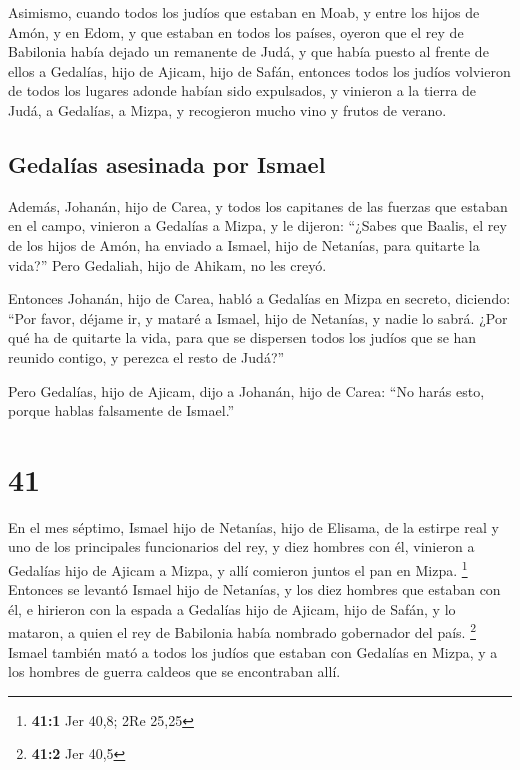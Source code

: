  Asimismo, cuando todos los judíos que estaban en Moab, y
entre los hijos de Amón, y en Edom, y que estaban en todos los países,
oyeron que el rey de Babilonia había dejado un remanente de Judá, y que
había puesto al frente de ellos a Gedalías, hijo de Ajicam, hijo de
Safán,  entonces todos los judíos volvieron de todos los
lugares adonde habían sido expulsados, y vinieron a la tierra de Judá, a
Gedalías, a Mizpa, y recogieron mucho vino y frutos de verano.

\hypertarget{gedaluxedas-asesinada-por-ismael}{%
\subsection{Gedalías asesinada por
Ismael}\label{gedaluxedas-asesinada-por-ismael}}

 Además, Johanán, hijo de Carea, y todos los capitanes de
las fuerzas que estaban en el campo, vinieron a Gedalías a Mizpa,
 y le dijeron: ``¿Sabes que Baalis, el rey de los hijos
de Amón, ha enviado a Ismael, hijo de Netanías, para quitarte la vida?''
Pero Gedaliah, hijo de Ahikam, no les creyó.

 Entonces Johanán, hijo de Carea, habló a Gedalías en
Mizpa en secreto, diciendo: ``Por favor, déjame ir, y mataré a Ismael,
hijo de Netanías, y nadie lo sabrá. ¿Por qué ha de quitarte la vida,
para que se dispersen todos los judíos que se han reunido contigo, y
perezca el resto de Judá?''

 Pero Gedalías, hijo de Ajicam, dijo a Johanán, hijo de
Carea: ``No harás esto, porque hablas falsamente de Ismael.''

\hypertarget{section-40}{%
\section{41}\label{section-40}}

 En el mes séptimo, Ismael hijo de Netanías, hijo de
Elisama, de la estirpe real y uno de los principales funcionarios del
rey, y diez hombres con él, vinieron a Gedalías hijo de Ajicam a Mizpa,
y allí comieron juntos el pan en Mizpa. \footnote{\textbf{41:1} Jer
  40,8; 2Re 25,25}  Entonces se levantó Ismael hijo de
Netanías, y los diez hombres que estaban con él, e hirieron con la
espada a Gedalías hijo de Ajicam, hijo de Safán, y lo mataron, a quien
el rey de Babilonia había nombrado gobernador del país. \footnote{\textbf{41:2}
  Jer 40,5}  Ismael también mató a todos los judíos que
estaban con Gedalías en Mizpa, y a los hombres de guerra caldeos que se
encontraban allí.

